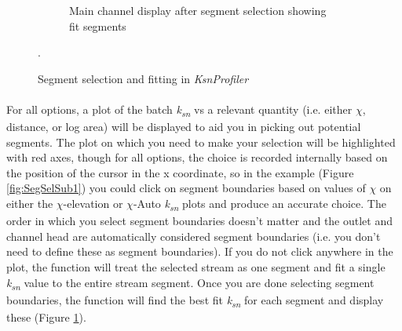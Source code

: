 \begin{figure}[H]
\begin{subfigure}{.5\textwidth}
		\caption{Main channel display after segment selection showing fit segments}
		\label{fig:SegSelSub2}
	\end{subfigure}
	\caption{Segment selection and fitting in \textit{KsnProfiler}}.
	\label{fig:SegSelect}
\end{figure}

\paragraph{}For all options, a plot of the batch \textit{k\textsubscript{sn}} vs a relevant quantity (i.e. either $\chi$, distance, or log area) will be displayed to aid you in picking out potential segments. The plot on which you need to make your selection will be highlighted with red axes, though for all options, the choice is recorded internally based on the position of the cursor in the x coordinate, so in the example (Figure \ref{fig:SegSelSub1}) you could click on segment boundaries based on values of $\chi$ on either the $\chi$-elevation or $\chi$-Auto \textit{k\textsubscript{sn}} plots and produce an accurate choice. The order in which you select segment boundaries doesn't matter and the outlet and channel head are automatically considered segment boundaries (i.e. you don't need to define these as segment boundaries). If you do not click anywhere in the plot, the function will treat the selected stream as one segment and fit a single \textit{k\textsubscript{sn}} value to the entire stream segment. Once you are done selecting segment boundaries, the function will find the best fit \textit{k\textsubscript{sn}} for each segment and display these (Figure \ref{fig:SegSelSub2}).

